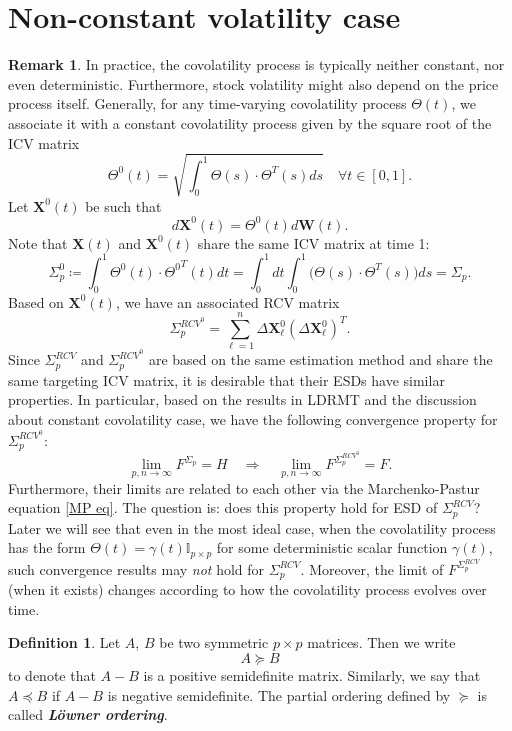 \documentclass[a4paper,11pt]{book}
\theoremstyle{plain}
\theoremstyle{definition}
\newtheorem{defn}[thm]{Definition}
\newtheorem{rmrk}[thm]{Remark}
\newcommand{\define}[1]{\textit{\textbf{#1}}}
\begin{document}
	\section{Non-constant volatility case}
	\begin{rmrk}
		In practice, the covolatility process is typically neither constant, nor even deterministic. Furthermore, stock volatility might also depend on the price process itself. Generally, for any time-varying covolatility process $\Theta(t)$, we associate it with a constant covolatility process given by the square root of the ICV matrix
		\[ \Theta^0(t) = \sqrt{\int_0^1\Theta(s) \cdot \Theta^T(s) ds} \quad \forall t \in [0, 1]. \]
		Let $\mathbf{X}^0(t)$ be such that
		\[ d\mathbf{X}^0(t) = \Theta^0(t) d\mathbf{W}(t). \]
		Note that $\mathbf{X}(t)$ and $\mathbf{X}^0(t)$ share the same ICV matrix at time 1:
		\[ \Sigma_p^0 \coloneqq  \int_0^1 \Theta^0(t) \cdot {\Theta^0}^T(t) dt = \int_0^1 dt \int_0^1\Big( \Theta(s) \cdot {\Theta}^T(s)\Big) ds = \Sigma_p.  \]
		Based on $\mathbf{X}^0(t)$, we have an associated RCV matrix
		\[ \Sigma_p^{RCV^0} = \sum_{\ell=1}^{n} \Delta \mathbf{X}_\ell^0 (\Delta \mathbf{X}_\ell^0)^T. \]
		Since $\Sigma_p^{RCV}$ and $\Sigma_p^{RCV^0}$ are based on the same estimation method and share the same targeting ICV matrix, it is desirable that their ESDs have similar properties. In particular, based on the results in LDRMT and the discussion about constant covolatility case, we have the following convergence property for $\Sigma_p^{RCV^0}$: 
		\[ \lim_{p,n \rightarrow \infty} F^{\Sigma_p} = H \quad \Longrightarrow\quad \lim_{p,n \rightarrow \infty} F^{\Sigma_p^{RCV^0}} = F. \]
		Furthermore, their limits are related to each other via the Marchenko-Pastur equation \eqref{MP eq}. The question is: does this property hold for ESD of $\Sigma_p^{RCV}$? Later we will see that even in the most ideal case, when the covolatility process has the form $\Theta(t) =\gamma(t) \mathbb{I}_{p \times p}$ for some deterministic scalar function $\gamma(t)$, such convergence results may \textit{not} hold for $\Sigma_p^{RCV}$. Moreover, the limit of $F^{\Sigma_p^{RCV}}$ (when it exists) changes according to how the covolatility process evolves over time.
	\end{rmrk}
	
	\begin{defn}
		Let $A$, $B$ be two symmetric $p \times p$ matrices. Then we write
		\[ A \succeq B\]
		to denote that $A-B$ is a positive semidefinite matrix. Similarly, we say that $A \preceq B$ if $A-B$ is negative semidefinite. The partial ordering defined by $\succeq$ is called \define{L\"owner ordering}.
	\end{defn}
	
\end{document}
